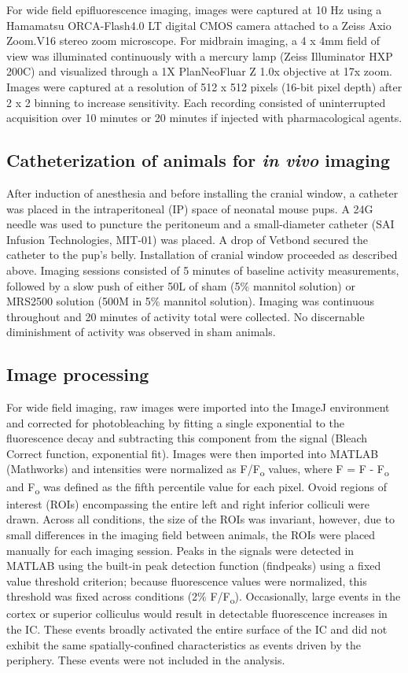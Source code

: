 \documentclass[9pt,lineno]{elife}
\begin{document}
For wide field epifluorescence imaging, images were captured at 10 Hz using a Hamamatsu ORCA-Flash4.0 LT digital CMOS camera attached to a Zeiss Axio Zoom.V16 stereo zoom microscope. For midbrain imaging, a 4 x 4mm field of view was illuminated continuously with a mercury lamp (Zeiss Illuminator HXP 200C) and visualized through a 1X PlanNeoFluar Z 1.0x objective at 17x zoom. Images were captured at a resolution of 512 x 512 pixels (16-bit pixel depth) after 2 x 2 binning to increase sensitivity. Each recording consisted of uninterrupted acquisition over 10 minutes or 20 minutes if injected with pharmacological agents.

\subsection{Catheterization of animals for \textit{in vivo} imaging}
After induction of anesthesia and before installing the cranial window, a catheter was placed in the intraperitoneal (IP) space of neonatal mouse pups. A 24G needle was used to puncture the peritoneum and a small-diameter catheter (SAI Infusion Technologies, MIT-01) was placed. A drop of Vetbond secured the catheter to the pup’s belly. Installation of cranial window proceeded as described above.
Imaging sessions consisted of 5 minutes of baseline activity measurements, followed by a slow push of either 50\textmu L of sham (5\% mannitol solution) or MRS2500 solution (500\textmu M in 5\% mannitol solution). Imaging was continuous throughout and 20 minutes of activity total were collected. No discernable diminishment of activity was observed in sham animals.

\subsection{Image processing}
For wide field imaging, raw images were imported into the ImageJ environment and corrected for photobleaching by fitting a single exponential to the fluorescence decay and subtracting this component from the signal (Bleach Correct function, exponential fit). Images were then imported into MATLAB (Mathworks) and intensities were normalized as \textDelta F/F\textsubscript{o} values, where \textDelta F = F - F\textsubscript{o}  and F\textsubscript{o} was defined as the fifth percentile value for each pixel. Ovoid regions of interest (ROIs) encompassing the entire left and right inferior colliculi were drawn. Across all conditions, the size of the ROIs was invariant, however, due to small differences in the imaging field between animals, the ROIs were placed manually for each imaging session. Peaks in the signals were detected in MATLAB using the built-in peak detection function (findpeaks) using a fixed value threshold criterion; because fluorescence values were normalized, this threshold was fixed across conditions (2\% \textDelta F/F\textsubscript{o}). Occasionally, large events in the cortex or superior colliculus would result in detectable fluorescence increases in the IC. These events broadly activated the entire surface of the IC and did not exhibit the same spatially-confined characteristics as events driven by the periphery. These events were not included in the analysis. 
\end{document}
